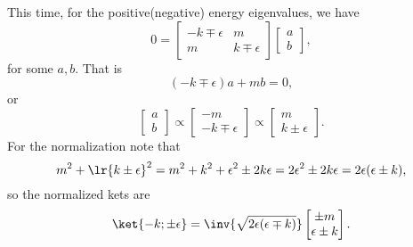 This time, for the positive(negative) energy eigenvalues, we have
%
\begin{dmath}\label{eqn:gradQuantumProblemSet4Problem3:141}
0
=
\begin{bmatrix}
-k \mp \epsilon & m \\
m & k \mp \epsilon
\end{bmatrix}
\begin{bmatrix}
a \\
b
\end{bmatrix},
\end{dmath}
%
for some \( a, b\).  That is
%
\begin{dmath}\label{eqn:gradQuantumProblemSet4Problem3:161}
(-k \mp \epsilon) a + m b = 0,
\end{dmath}
%
or
%
\begin{dmath}\label{eqn:gradQuantumProblemSet4Problem3:181}
\begin{bmatrix}
a \\
b
\end{bmatrix}
\propto
\begin{bmatrix}
- m \\
-k \mp \epsilon
\end{bmatrix}
\propto
\begin{bmatrix}
m \\
k \pm \epsilon
\end{bmatrix}.
\end{dmath}
%
For the normalization note that
%
\begin{dmath}\label{eqn:gradQuantumProblemSet4Problem3:201}
m^2 + \lr{ k \pm \epsilon }^2
=
m^2 + k^2 + \epsilon^2 \pm 2 k \epsilon
=
2 \epsilon^2 \pm 2 k \epsilon
=
2 \epsilon (\epsilon \pm k),
\end{dmath}
%
so the normalized kets are
%
\begin{dmath}\label{eqn:gradQuantumProblemSet4Problem3:221}
\ket{-k; \pm\epsilon} =
\inv{\sqrt{2 \epsilon(\epsilon \mp k)}}
\begin{bmatrix}
\pm m \\
\epsilon \pm k
\end{bmatrix}.
\end{dmath}
%

